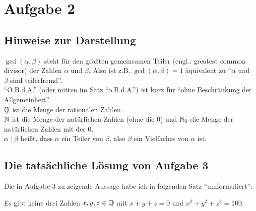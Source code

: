 \section{Aufgabe 2}

\subsection*{Hinweise zur Darstellung}

$\gcd(\alpha, \beta)$ steht für den größten gemeinsamen Teiler (engl.: greatest common divisor) der Zahlen $\alpha$ 
und $\beta$. Also ist z.B. $\gcd(\alpha, \beta) = 1$ äquivalent zu "`$\alpha$ und $\beta$ sind teilerfremd"'.\\
"`O.B.d.A."' (oder mitten im Satz "`o.B.d.A."') ist kurz für "`ohne Beschränkung der Allgemeinheit"'.\\
$\mathbb{Q}$ ist die Menge der rationalen Zahlen.\\
$\mathbb{N}$ ist die Menge der natürlichen Zahlen (ohne die 0) und $\mathbb{N}_0$ die Menge der natürlichen Zahlen mit der 0.\\
$\alpha \mid \beta$ heißt, dass $\alpha$ ein Teiler von $\beta$, also $\beta$ ein Vielfaches von $\alpha$ ist.

\subsection*{Die tatsächliche Lösung von Aufgabe 3}

Die in Aufgabe 3 zu zeigende Aussage habe ich in folgenden Satz "`umformuliert"':

\begin{thm}
    Es gibt keine drei Zahlen $x, y, z \in \mathbb{Q}$ mit $x + y + z = 0$ und $x^2 + y^2 + z^2 = 100$. \label{aufgabe_3}
\end{thm}

